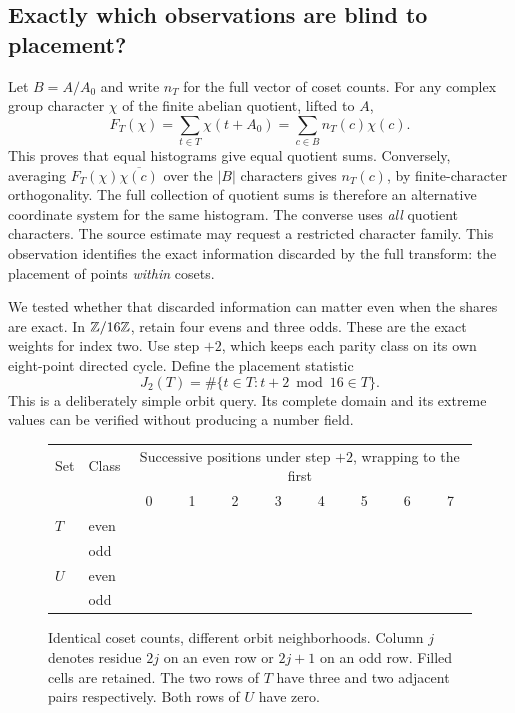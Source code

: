 \documentclass[11pt,letterpaper]{article}
\begin{document}
\subsection{Exactly which observations are blind to placement?}
Let \(B=A/A_0\) and write \(n_T\) for the full vector of coset counts. For any complex group character \(\chi\) of the finite abelian quotient, lifted to \(A\),
\[
 F_T(\chi)=\sum_{t\in T}\chi(t+A_0)=\sum_{c\in B} n_T(c)\chi(c).
\]
This proves that equal histograms give equal quotient sums. Conversely, averaging \(F_T(\chi)\overline{\chi(c)}\) over the \(|B|\) characters gives \(n_T(c)\), by finite-character orthogonality. The full collection of quotient sums is therefore an alternative coordinate system for the same histogram. The converse uses \emph{all} quotient characters. The source estimate may request a restricted character family. This observation identifies the exact information discarded by the full transform: the placement of points \emph{within} cosets.

We tested whether that discarded information can matter even when the shares are exact. In \(\mathbb Z/16\mathbb Z\), retain four evens and three odds. These are the exact weights for index two. Use step \(+2\), which keeps each parity class on its own eight-point directed cycle. Define the placement statistic
\[
 J_2(T)=\#\{t\in T:t+2\bmod 16\in T\}.
\]
This is a deliberately simple orbit query. Its complete domain and its extreme values can be verified without producing a number field.
\newcommand{\onpt}{\colorbox{teal}{\makebox[.9em]{\textcolor{white}{\(\bullet\)}}}}
\newcommand{\offpt}{\colorbox{unselected}{\makebox[.9em]{\textcolor{quiet}{\(\cdot\)}}}}
\begin{figure}[htbp]\centering\small
\setlength{\tabcolsep}{7pt}\renewcommand{\arraystretch}{1.16}
\begin{tabular}{@{}llcccccccc@{}}
\toprule
Set & Class & \multicolumn{8}{c}{Successive positions under step \(+2\), wrapping to the first}\\
 & & 0 & 1 & 2 & 3 & 4 & 5 & 6 & 7\\ \midrule
\(T\) & even &\onpt&\onpt&\onpt&\onpt&\offpt&\offpt&\offpt&\offpt\\
 & odd &\onpt&\onpt&\onpt&\offpt&\offpt&\offpt&\offpt&\offpt\\
\(U\) & even &\onpt&\offpt&\onpt&\offpt&\onpt&\offpt&\onpt&\offpt\\
 & odd &\onpt&\offpt&\onpt&\offpt&\onpt&\offpt&\offpt&\offpt\\
\bottomrule
\end{tabular}
\caption{Identical coset counts, different orbit neighborhoods. Column \(j\) denotes residue \(2j\) on an even row or \(2j+1\) on an odd row. Filled cells are retained. The two rows of \(T\) have three and two adjacent pairs respectively. Both rows of \(U\) have zero.}
\label{fig:orbits}
\end{figure}
\end{document}
